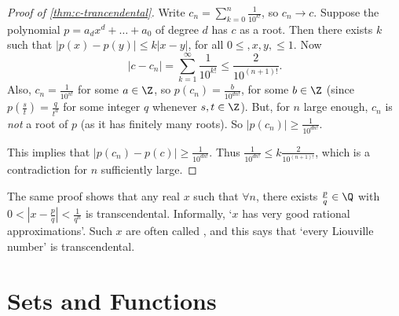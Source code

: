 \documentclass[a4paper]{scrreprt}
\begin{document}
\begin{center}

\end{center}

\begin{proof}[Proof of \autoref{thm:c-trancendental}]
	Write $c_n = \sum_{k = 0}^{n} \frac{1}{10^{k!}}$, so $c_n \rightarrow c$. Suppose the polynomial $p = a_d x^d + \dots + a_0$ of degree $d$ has $c$ as a root. 
	Then there exists $k$ such that $|p(x) - p(y)| \leq k|x - y|$, for all $0 \leq, x, y, \leq 1$. Now 
	$$|c - c_n| = \sum_{k = 1}^{\infty} \frac{1}{10^{k!}} \leq \frac{2}{10^{(n + 1)!}}.$$
Also, $c_n = \frac{1}{10^{n!}}$ for some $a \in \Z$, so $p(c_n) = \frac{b}{10^{dn!}}$, for some $b \in \Z$ (since $p(\frac{s}{t}) = \frac{q}{t^d}$ for some integer $q$ whenever $s, t \in \Z$).
But, for $n$ large enough, $c_n$ is \emph{not} a root of $p$ (as it has finitely many roots). So $|p(c_n)| \geq \frac{1}{10^{dn!}}$.

This implies that $|p(c_n) - p(c)| \geq \frac{1}{10^{dn!}}$. Thus $\frac{1}{10^{dn!}} \leq k \frac{2}{10^{(n + 1)!}}$, which is a contradiction for $n$ sufficiently large.
\end{proof}

\begin{remark}
	The same proof shows that any real $x$ such that $\forall n$, there exists $\frac{p}{q} \in \Q$ with $0 < |x - \frac{p}{q}| < \frac{1}{q^n}$ is transcendental. Informally, `$x$ has very good rational approximations'. Such $x$ are often called , and this says that `every Liouville number' is transcendental.
\end{remark}


\chapter{Sets and Functions}
\end{document}
